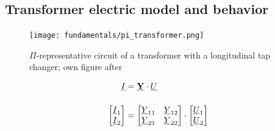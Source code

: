 \subsection{Transformer electric model and behavior}

\begin{figure}[h!]
    \centering
    \texttt{[image: fundamentals/pi\_transformer.png]}
    \caption[$\Pi$-representative circuit of a transformer with a longitudinal tap changer]{$\Pi$-representative circuit of a transformer with a longitudinal tap changer; own figure after \autocite{machowskiPowerSystemDynamics2020,burlakinEnhancedVoltageControl2024}}
    \label{fig:pi-transformer}
\end{figure}

\begin{align}
    \underline{I}&=\underline{\mathrm{\textbf{Y}}} \cdot \underline{U} \notag \\[12pt]
    \begin{bmatrix}
        \underline{I}_1 \\
        \underline{I}_2
    \end{bmatrix}&= 
    \begin{bmatrix}
        \underline{Y}_{11} & \underline{Y}_{12} \\
        \underline{Y}_{21} & \underline{Y}_{22}
    \end{bmatrix} \cdot
    \begin{bmatrix}
        \underline{U}_1 \\
        \underline{U}_2
    \end{bmatrix} \label{eq:admittance}
\end{align}

